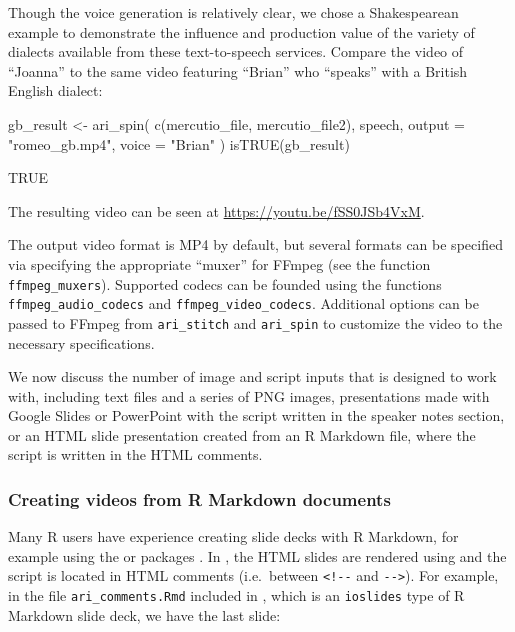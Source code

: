 Though the voice generation is relatively clear, we chose a
Shakespearean example to demonstrate the influence and production value
of the variety of dialects available from these text-to-speech services.
Compare the video of ``Joanna'' to the same video featuring ``Brian''
who ``speaks'' with a British English dialect:

\begin{Schunk}
\begin{Sinput}
gb_result <- ari_spin(
  c(mercutio_file, mercutio_file2),
  speech,
  output = "romeo_gb.mp4", voice = "Brian"
)
isTRUE(gb_result)
\end{Sinput}
\end{Schunk}

\begin{Schunk}
\begin{Soutput}
[1] TRUE
\end{Soutput}
\end{Schunk}

The resulting video can be seen at \url{https://youtu.be/fSS0JSb4VxM}.

The output video format is MP4 by default, but several formats can be
specified via specifying the appropriate ``muxer'' for FFmpeg (see the
function \texttt{ffmpeg\_muxers}). Supported codecs can be founded using
the functions \texttt{ffmpeg\_audio\_codecs} and
\texttt{ffmpeg\_video\_codecs}. Additional options can be passed to
FFmpeg from \texttt{ari\_stitch} and \texttt{ari\_spin} to customize the
video to the necessary specifications.

We now discuss the number of image and script inputs that  is
designed to work with, including text files and a series of PNG images,
presentations made with Google Slides or PowerPoint with the script
written in the speaker notes section, or an HTML slide presentation
created from an R Markdown file, where the script is written in the HTML
comments.

\hypertarget{creating-videos-from-r-markdown-documents}{%
\subsubsection{Creating videos from R Markdown
documents}\label{creating-videos-from-r-markdown-documents}}

Many R users have experience creating slide decks with R Markdown, for
example using the  or  packages
\citep{rmarkdown, rmarkdownbook, xaringan}. In , the HTML
slides are rendered using  \citep{webshot} and the
script is located in HTML comments (i.e.~between
\texttt{\textless{}!-\/-} and \texttt{-\/-\textgreater{}}). For example,
in the file \texttt{ari\_comments.Rmd} included in , which is
an \texttt{ioslides} type of R Markdown slide deck, we have the last
slide:

